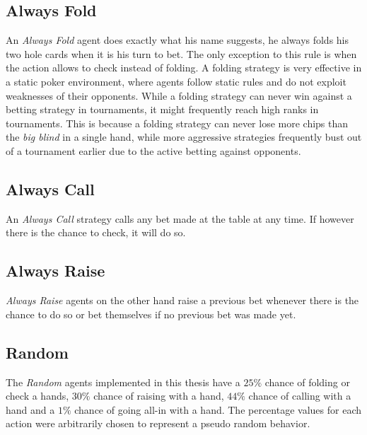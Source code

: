 \subsection{Always Fold}
An \textit{Always Fold} agent does exactly what his name suggests, he always folds his two hole cards when it is his turn to bet. The only exception to this rule is when the action allows to check instead of folding. A folding strategy is very effective in a static poker environment, where agents follow static rules and do not exploit weaknesses of their opponents. While a folding strategy can never win against a betting strategy in tournaments, it might frequently reach high ranks in tournaments. This is because a folding strategy can never lose more chips than the \textit{big blind} in a single hand, while more aggressive strategies frequently bust out of a tournament earlier due to the active betting against opponents.
\subsection{Always Call}
An \textit{Always Call} strategy calls any bet made at the table at any time. If however there is the chance to check, it will do so. 
\subsection{Always Raise}
\textit{Always Raise} agents on the other hand raise a previous bet whenever there is the chance to do so or bet themselves if no previous bet was made yet. 
\subsection{Random}
The \textit{Random} agents implemented in this thesis have a $25\%$ chance of folding or check a hands, $30\%$ chance of raising with a hand, $44\%$ chance of calling with a hand and a $1\%$ chance of going all-in with a hand. The percentage values for each action were arbitrarily chosen to represent a pseudo random behavior.

